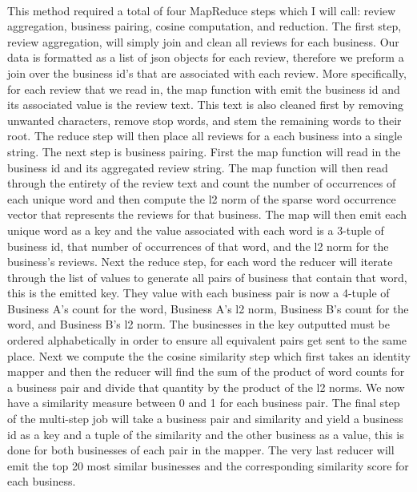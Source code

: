 \documentclass[paper=letter, fontsize=15pt]{article} %
\begin{document}
\paragraph{}This method required a total of four MapReduce steps which I will call: review aggregation, business pairing, cosine computation, and reduction. The first step, review aggregation, will simply join and clean all reviews for each business. Our data is formatted as a list of json objects for each review, therefore we preform a join over the business id's that are associated with each review. More specifically, for each review that we read in, the map function with emit the business id and its associated value is the review text. This text is also cleaned first by removing unwanted characters, remove stop words, and stem the remaining words to their root. The reduce step will then place all reviews for a each business into a single string. The next step is business pairing. First the map function will read in the business id and its aggregated review string. The map function will then read through the entirety of the review text and count the number of occurrences of each unique word and then compute the l2 norm of the sparse word occurrence vector that represents the reviews for that business.  The map will then emit each unique word as a key and the value associated with each word is a 3-tuple of business id, that number of occurrences of that word, and the l2 norm for the business's reviews. Next the reduce step, for each word the reducer will iterate through the list of values to generate all pairs of business that contain that word, this is the emitted key. They value with each business pair is now a 4-tuple of Business A's count for the word, Business A's l2 norm, Business B's count for the word, and Business B's l2 norm. The businesses in the key outputted must be ordered alphabetically in order to ensure all equivalent pairs get sent to the same place. Next we compute the the cosine similarity step which first takes an identity mapper and then the reducer will find the sum of the product of word counts for a business pair and divide that quantity by the product of the l2 norms. We now have a similarity measure between 0 and 1 for each business pair. The final step of the multi-step job will take a business pair and similarity and yield a business id as a key and a tuple of the similarity and the other business as a value, this is done for both businesses of each pair in the mapper. The very last reducer will emit the top 20 most similar businesses and the corresponding similarity score for each business. 
\end{document}
